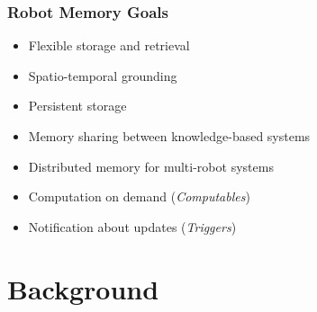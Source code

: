 \begin{frame}
  \frametitle{Robot Memory Goals}
  \begin{itemize}
  \item Flexible storage and retrieval %
  \item Spatio-temporal grounding
  \item Persistent storage
  \bigskip
  \item Memory sharing between knowledge-based systems
  \item Distributed memory for multi-robot systems
  \bigskip
  \item Computation on demand (\emph{Computables})
  \item Notification about updates (\emph{Triggers})
  \end{itemize}
\end{frame}


\section{Background}

